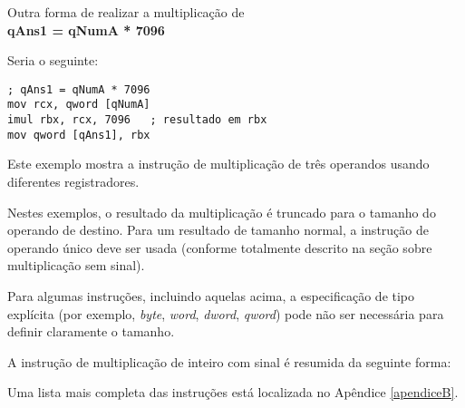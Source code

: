 Outra forma de realizar a multiplicação de\\
\textbf{qAns1 = qNumA * 7096}

Seria o seguinte:\\
\begin{lstlisting}
; qAns1 = qNumA * 7096
mov rcx, qword [qNumA]
imul rbx, rcx, 7096   ; resultado em rbx
mov qword [qAns1], rbx
\end{lstlisting}

Este exemplo mostra a instrução de multiplicação de três operandos usando diferentes registradores.

Nestes exemplos, o resultado da multiplicação é truncado para o tamanho do operando de destino. Para um resultado de tamanho normal, a instrução de operando único deve ser usada (conforme totalmente descrito na seção sobre multiplicação sem sinal).

Para algumas instruções, incluindo aquelas acima, a especificação de tipo explícita (por exemplo, \textit{byte}, \textit{word}, \textit{dword}, \textit{qword}) pode não ser necessária para definir claramente o tamanho.

A instrução de multiplicação de inteiro com sinal  é resumida da seguinte forma:


Uma lista mais completa das instruções está localizada no Apêndice \ref{apendiceB}.